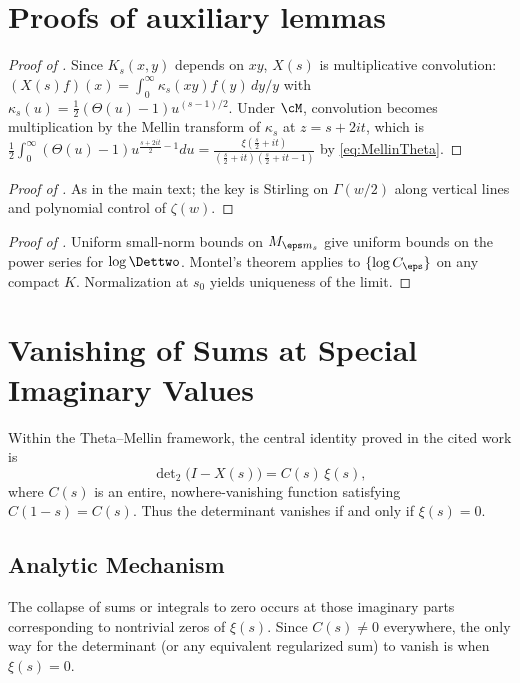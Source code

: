 \section{Proofs of auxiliary lemmas}

\begin{proof}[Proof of ]
Since \(K_s(x,y)\) depends on \(xy\), \(X(s)\) is multiplicative convolution:
\((X(s)f)(x)=\int_0^\infty \kappa_s(xy) f(y)\,dy/y\) with \(\kappa_s(u)=\tfrac12(\Theta(u)-1)u^{(s-1)/2}\).
Under \(\cM\), convolution becomes multiplication by the Mellin transform of \(\kappa_s\) at \(z=s+2it\), which is
\(
\frac12\int_0^\infty (\Theta(u)-1)u^{\frac{s+2it}{2}-1}du
=\frac{\xi(\frac{s}{2}+it)}{\left(\frac{s}{2}+it\right)\left(\frac{s}{2}+it-1\right)}
\)
by \eqref{eq:MellinTheta}.
\end{proof}

\begin{proof}[Proof of ]
As in the main text; the key is Stirling on \(\Gamma(w/2)\) along vertical lines and polynomial control of \(\zeta(w)\).
\end{proof}

\begin{proof}[Proof of ]
Uniform small-norm bounds on \(M_{\eps m_s}\) give uniform bounds on the power series for \(\log\Dettwo\). Montel’s theorem applies to \(\{\log C_\eps\}\) on any compact \(K\). Normalization at \(s_0\) yields uniqueness of the limit.
\end{proof}

\section{Vanishing of Sums at Special Imaginary Values}

Within the Theta--Mellin framework, the central identity proved in the cited work is
\begin{equation}
\det\nolimits_{2}\big(I - X(s)\big) = C(s)\, \xi(s),
\end{equation}
where $C(s)$ is an entire, nowhere-vanishing function satisfying $C(1-s) = C(s)$. Thus the determinant vanishes if and only if $\xi(s)=0$.

\subsection{Analytic Mechanism}
The collapse of sums or integrals to zero occurs at those imaginary parts corresponding to nontrivial zeros of $\xi(s)$. Since $C(s)\neq 0$ everywhere, the only way for the determinant (or any equivalent regularized sum) to vanish is when $\xi(s)=0$.

